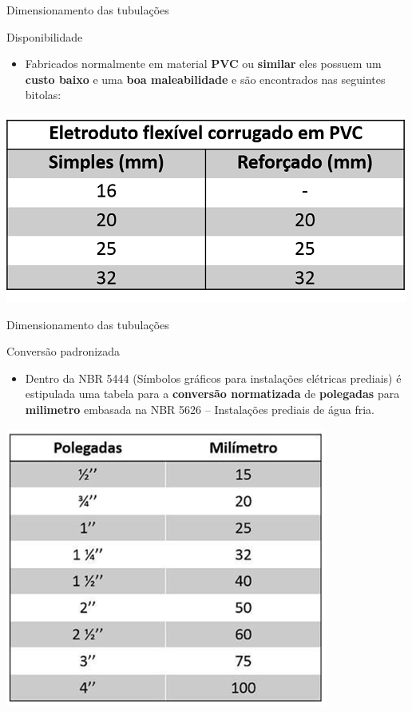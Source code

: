 \begin{frame}{Dimensionamento das tubulações}
	\begin{block}{Disponibilidade}
		\begin{itemize}
			\item Fabricados normalmente em material \textbf{PVC} ou \textbf{similar} eles possuem um \textbf{custo baixo} e uma \textbf{boa maleabilidade} e são encontrados nas seguintes bitolas:
		\end{itemize}
	\end{block}
	\bigskip

	\centering
	\includegraphics[width=0.7\linewidth]{Figuras/Ch06/fig8}
\end{frame}


\begin{frame}{Dimensionamento das tubulações}
	\begin{block}{Conversão padronizada}
		\begin{itemize}
			\item Dentro da NBR 5444 (Símbolos gráficos para instalações elétricas prediais) é estipulada uma tabela para a \textbf{conversão normatizada} de \textbf{polegadas} para \textbf{milimetro} embasada na NBR 5626 -- Instalações prediais de água fria.
		\end{itemize}
	\end{block}

	\centering
	\includegraphics[width=0.45\linewidth]{Figuras/Ch06/fig9}
\end{frame}


